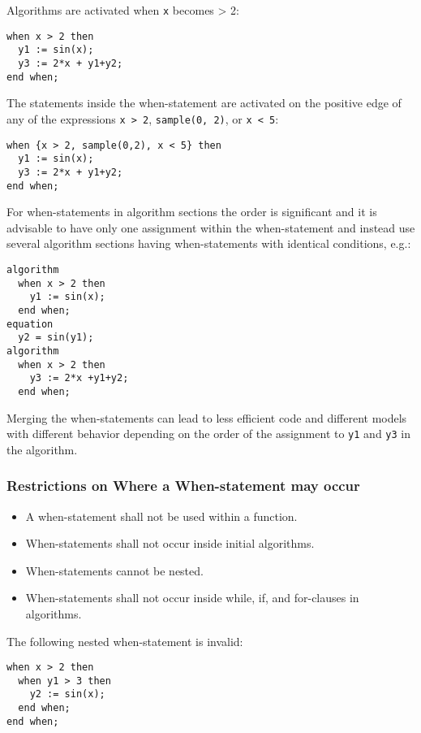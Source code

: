 \begin{example}
Algorithms are activated when \lstinline!x! becomes \textgreater{} 2:
\begin{lstlisting}[language=modelica]
when x > 2 then
  y1 := sin(x);
  y3 := 2*x + y1+y2;
end when;
\end{lstlisting}
The statements inside the when-statement are activated on the positive edge of any of the expressions
\lstinline!x > 2!, \lstinline!sample(0, 2)!, or \lstinline!x < 5!:
\begin{lstlisting}[language=modelica]
when {x > 2, sample(0,2), x < 5} then
  y1 := sin(x);
  y3 := 2*x + y1+y2;
end when;
\end{lstlisting}
For when-statements in algorithm sections the order is significant
and it is advisable to have only one assignment within the
when-statement and instead use several algorithm sections having
when-statements with identical conditions, e.g.:
\begin{lstlisting}[language=modelica]
algorithm
  when x > 2 then
    y1 := sin(x);
  end when;
equation
  y2 = sin(y1);
algorithm
  when x > 2 then
    y3 := 2*x +y1+y2;
  end when;
\end{lstlisting}
Merging the when-statements can lead to less efficient code and
different models with different behavior depending on the order of the
assignment to \lstinline!y1! and \lstinline!y3! in the algorithm.
\end{example}

\subsubsection{Restrictions on Where a When-statement may occur}\label{restrictions-on-where-a-when-statement-may-occur}
\begin{itemize}
\item
  A when-statement shall not be used within a function.
\item
  When-statements shall not occur inside initial algorithms.
\item
  When-statements cannot be nested.
\item
  When-statements shall not occur inside while, if, and for-clauses in
  algorithms.
\end{itemize}

\begin{example}
The following nested when-statement is invalid:
\begin{lstlisting}[language=modelica]
when x > 2 then
  when y1 > 3 then
    y2 := sin(x);
  end when;
end when;
\end{lstlisting}
\end{example}

